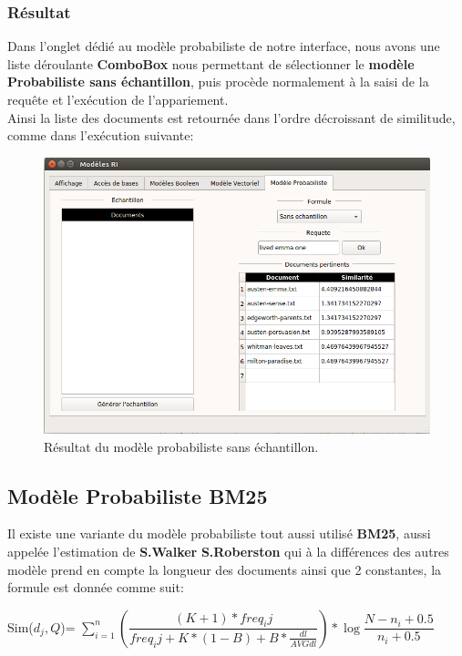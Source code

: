 \documentclass[12pt,a4paper,oneside]{article}
\begin{document}
\subsubsection*{Résultat}
Dans l'onglet dédié au modèle probabiliste de notre interface, nous avons une liste déroulante \textbf{ComboBox} nous permettant de sélectionner le \textbf{modèle Probabiliste sans échantillon}, puis procède normalement à la saisi de la requête et l'exécution de l'appariement.\\

Ainsi la liste des documents est retournée dans l'ordre décroissant de similitude, comme dans l'exécution suivante:

	\begin{figure}[H]
		\centering
		\includegraphics[scale=0.4]{images/modeleP3.png}
		\caption{Résultat du modèle probabiliste sans échantillon.}
	\end{figure}



\newpage

\subsection{Modèle Probabiliste BM25}
Il existe une variante du modèle probabiliste tout aussi utilisé \textbf{BM25}, aussi appelée l'estimation de \textbf{S.Walker}  \textbf{S.Roberston} qui à la différences des autres modèle prend en compte la longueur des documents ainsi que 2 constantes, la formule est donnée comme suit:
\begin{center}
	Sim($d_{j},Q$)= $\sum_{i=1}^{n} (\dfrac{(K+1)*freq_ij}{freq_ij + K*(1-B)+B*\frac{dl}{AVG dl}}) * \log \dfrac{N-n_{i}+0.5}{n_{i}+0.5}$
\end{center}
\end{document}
